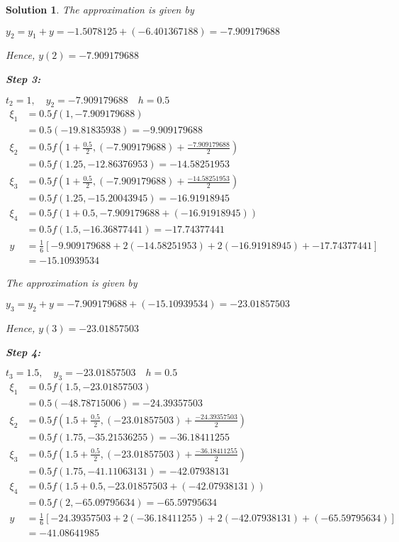 \documentclass[12pt,a4paper]{article}
\newtheorem{solution}[theorem]{Solution}
\begin{document}
\begin{solution}
The approximation is given by 

$ y_2 = y_1 + y = -1.5078125 + (-6.401367188) = -7.909179688$

Hence, \quad $y(2) = -7.909179688$

\textbf{Step 3:}

$t_2 = 1, \quad y_2= -7.909179688 \quad h=0.5 $
\begin{align*}
\xi_1 &= 0.5f(1,-7.909179688) \\
&= 0.5(-19.81835938) = -9.909179688 \\
\xi_2 &= 0.5f\left( 1 + \frac{0.5}{2}, (-7.909179688) + \frac{-7.909179688}{2} \right)  \\
&= 0.5f(1.25, -12.86376953) = -14.58251953 \\
\xi_3 &= 0.5f\left( 1 + \frac{0.5}{2}, (-7.909179688) + \frac{-14.58251953}{2}\right)  \\
&= 0.5f(1.25, -15.20043945) = -16.91918945 \\
\xi_4 &= 0.5f(1 + 0.5, -7.909179688 +(-16.91918945)) \\
&= 0.5f(1.5, -16.36877441) = -17.74377441\\
y &= \frac{1}{6} \left[ -9.909179688 + 2(-14.58251953) + 2(-16.91918945) + -17.74377441 \right] \\
&= -15.10939534
\end{align*}

The approximation is given by 

$ y_3 = y_2 + y = -7.909179688 + (-15.10939534) = -23.01857503$

Hence, \quad $y(3) = -23.01857503$

\textbf{Step 4:}

$t_3 = 1.5, \quad y_3= -23.01857503 \quad h=0.5 $
\begin{align*}
\xi_1 &= 0.5f(1.5,-23.01857503) \\
&= 0.5(-48.78715006) = -24.39357503 \\
\xi_2 &= 0.5f\left( 1.5 + \frac{0.5}{2}, (-23.01857503) + \frac{-24.39357503}{2} \right)  \\
&= 0.5f(1.75, -35.21536255) = -36.18411255 \\
\xi_3 &= 0.5f\left( 1.5 + \frac{0.5}{2}, (-23.01857503) + \frac{-36.18411255}{2}\right)  \\
&= 0.5f(1.75, -41.11063131) = -42.07938131 \\
\xi_4 &= 0.5f(1.5 + 0.5, -23.01857503 +(-42.07938131)) \\
&= 0.5f(2, -65.09795634) = -65.59795634\\
y &= \frac{1}{6} \left[ -24.39357503 + 2(-36.18411255) + 2(-42.07938131) + (-65.59795634) \right] \\
&= -41.08641985
\end{align*}


\end{solution}
\end{document}

